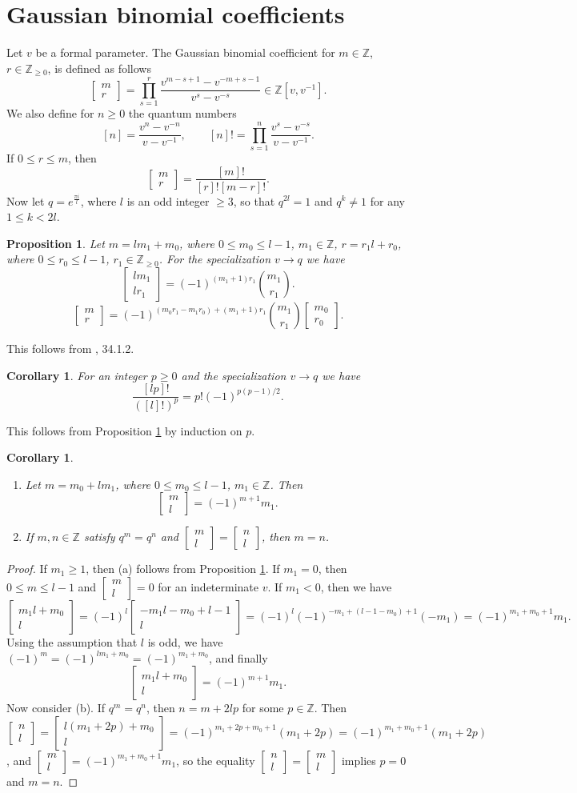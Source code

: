 \documentclass[11pt]{amsart}
\newcommand\qbin[2]{\left[  \begin{array}{c}  #1 \\ #2  \end{array}  \right]}
\newcommand{\Z}{\mathbb{Z}}
\newtheorem{corollary}[theorem]{Corollary}
\newtheorem{proposition}[theorem]{Proposition}
\begin{document}
\appendix
\section{Gaussian binomial coefficients}\label{gbcc}
Let $v$ be a formal parameter. The Gaussian binomial coefficient for $m \in \Z$, $r \in \mathbb{Z}_{\geq 0}$, is defined as follows 
\[ \qbin{m}{r} = \prod_{s=1}^r \frac{v^{m-s+1} - v^{-m+s-1}}{v^s-v^{-s}}  \in \Z[v, v^{-1}]. \] 
We also define for $n \geq 0$  the quantum numbers 
\[ [n] = \frac{v^n - v^{-n}}{v - v^{-1}} , \quad \quad  [n]! = \prod_{s=1}^n \frac{v^s - v^{-s}}{v-v^{-1}} .\] 
If $0 \leq r \leq m$, then 
\[ \qbin{m}{r} = \frac{[m]!}{[r]! [m-r]!} .\] 
Now let $q = e^{\frac{\pi i}{l}}$, where $l$ is an odd integer $\geq 3$, so that $q^{2l} =1$ and $q^k \neq 1$ for any $1 \leq k < 2l$. 


\begin{proposition}  \label{q-bin1} 
	Let $m = lm_1 + m_0$, where $0 \leq m_0 \leq l-1$, $m_1 \in \Z$, $r= r_1 l + r_0$, where $0 \leq r_0 \leq l-1$, $r_1 \in \mathbb{Z}_{\geq 0}$. 
	For the specialization $v \rightarrow q$ we have  
	\[ \qbin{lm_1}{lr_1} =  (-1)^{(m_1+1)r_1} { m_1 \choose r_1}   .\] 
	\[ \qbin{m}{r} =    (-1)^{(m_0 r_1 - m_1 r_0)+(m_1+1)r_1} { m_1 \choose r_1}  \qbin{m_0}{r_0} .\] 
\end{proposition} 
This follows from \cite{Lus94}, 34.1.2. 

\begin{corollary}  \label{q-bin2} 
	For an integer $p \geq 0$ and the specialization $v \rightarrow q$ we have 
	\[ \frac{[lp]!}{([l]!)^p} = p! (-1)^{p(p-1)/2} . \] 
\end{corollary} 
This  follows from Proposition \ref{q-bin1} by induction on $p$. 

\begin{corollary}  \label{q-bin3} 
	\begin{enumerate} 
		\item Let $m = m_0 + l m_1$, where $0 \leq m_0 \leq l-1$, $m_1 \in \Z$. Then 
		\[ \qbin{m}{l} = (-1)^{m +1} m_1. \] 
		\item If $m, n \in \Z$ satisfy $q^m = q^n$ and $\qbin{m}{l} = \qbin{n}{l}$, then $m=n$. 
	\end{enumerate} 
\end{corollary} 
\begin{proof} 
	If $m_1 \geq 1$, then  (a) follows from Proposition \ref{q-bin1}. If $m_1=0$, then $0 \leq m \leq l-1$ and $\qbin{m}{l} =0$ for an indeterminate $v$. If $m_1 <0$, then we have 
	\[ \qbin{m_1 l + m_0 }{l} = (-1)^l \qbin{-m_1 l - m_0 + l -1}{l} = (-1)^l (-1)^{-m_1+ (l-1 -m_0)+1} (-m_1) = (-1)^{m_1 + m_0+1}m_1.  \] 
	Using the assumption that $l$ is odd, we have $(-1)^m = (-1)^{lm_1 + m_0} = (-1)^{m_1+ m_0}$, and finally 
	\[ \qbin{m_1 l + m_0 }{l} = (-1)^{m+1} m_1 .\] 
	Now consider (b). If $q^m = q^n$, then $n = m + 2lp$ for some $p \in \Z$. Then $\qbin{n}{l} = \qbin{l(m_1+2p)+m_0}{l} = (-1)^{m_1 + 2p + m_0 +1} (m_1 + 2p) = (-1)^{m_1+ m_0 +1} (m_1+2p)$, and $\qbin{m}{l} = (-1)^{m_1+ m_0 +1}m_1$, 
	so the equality $\qbin{n}{l} = \qbin{m}{l}$ implies $p=0$ and $m=n$. 
\end{proof} 
\end{document}

